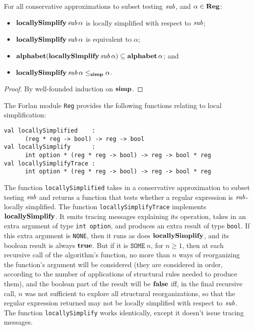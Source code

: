 \begin{theorem}
For all conservative approximations to subset testing ${\it sub}$,
and $\alpha\in\mathbf{Reg}$:
\begin{itemize}
\item $\mathbf{locallySimplify}\,{\it sub}\,\alpha$ is locally simplified with
  respect to ${\it sub}$;

\item $\mathbf{locallySimplify}\,{\it sub}\,\alpha$ is equivalent to $\alpha$;

\item $\mathbf{alphabet}(\mathbf{locallySimplify}\,{\it sub}\,\alpha)\subseteq\mathbf{alphabet}\,\alpha$;
  and

\item $\mathbf{locallySimplify}\,{\it sub}\,\alpha\mathrel{\leq_{\mathbf{simp}}}\alpha$.
\end{itemize}
\end{theorem}

\begin{proof}
By well-founded induction on $\mathrel{\mathbf{simp}}$.
\end{proof}

The Forlan module \texttt{Reg} provides the following functions
relating to local simplification:
\begin{verbatim}
val locallySimplified    :
      (reg * reg -> bool) -> reg -> bool
val locallySimplify      :
      int option * (reg * reg -> bool) -> reg -> bool * reg
val locallySimplifyTrace :
      int option * (reg * reg -> bool) -> reg -> bool * reg
\end{verbatim}
%
%
%
The function \texttt{locallySimplified} takes in a conservative
approximation to subset testing ${\it sub}$ and returns a function that
tests whether a regular expression is ${\it sub}$-locally simplified.  The
function \texttt{locallySimplifyTrace} implements $\mathbf{locallySimplify}$.
It emits tracing messages explaining its operation, takes in an extra
argument of type \texttt{int~option}, and produces an extra result of
type \texttt{bool}.  If this extra argument is \texttt{NONE}, then it
runs as does $\mathbf{locallySimplify}$, and its boolean result is always
$\mathbf{true}$.  But if it is $\mathtt{SOME}\;n$, for $n\geq 1$, then at each
recursive call of the algorithm's function, no more than $n$ ways of
reorganizing the function's argument will be considered (they are
considered in order, according to the number of applications of
structural rules needed to produce them), and the boolean part of the
result will be $\mathbf{false}$ iff, in the final recursive call, $n$ was not
sufficient to explore all structural reorganizations, so that the
regular expression returned may not be locally simplified with respect
to ${\it sub}$.  The function \texttt{locallySimplify} works identically,
except it doesn't issue tracing messages.

